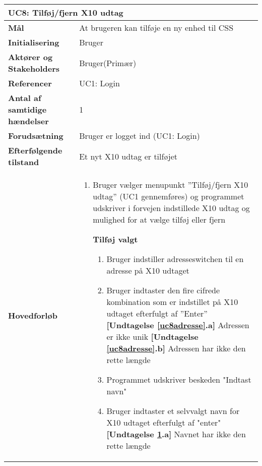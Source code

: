 \begin{table}[H] \centering
\begin{tabular}{|p{5cm}|p{9cm}|}
	\hline
		\multicolumn{2}{|l|}{\textbf{UC8: Tilføj/fjern X10 udtag}} \\\hline
		
		\textbf{Mål}							&At brugeren kan tilføje en ny enhed til CSS	\\\hline
		\textbf{Initialisering}				&Bruger					 					\\\hline
		\textbf{Aktører og Stakeholders}		&Bruger(Primær)								\\\hline
		\textbf{Referencer}					&UC1: Login									\\\hline
		\textbf{Antal af samtidige hændelser}&1 											\\\hline
		\textbf{Forudsætning}				&Bruger er logget ind (UC1: Login)			\\\hline
		\textbf{Efterfølgende tilstand}		&Et nyt X10 udtag er tilføjet 				\\\hline
		\textbf{Hovedforløb}					
			&\begin{enumerate}
				
				\item Bruger vælger menupunkt ''Tilføj/fjern X10 udtag'' (UC1 gennemføres) og programmet udskriver i forvejen indstillede X10 udtag og mulighed for at vælge tilføj eller fjern
					
				\subitem \textbf{Tilføj valgt}			
				\begin{enumerate}
					\item \label{uc8indstilAdresse} Bruger indstiller adresseswitchen til en adresse på X10 udtaget

					\item \label{uc8adresse} Bruger indtaster den fire cifrede kombination som er indstillet på X10 udtaget efterfulgt af ''Enter''\newline
						\textbf{[Undtagelse \ref{uc8adresse}.a]} Adressen er ikke unik\newline
						\textbf{[Undtagelse \ref{uc8adresse}.b]} Adressen har ikke den rette længde
				
					\item \label{uc8indstilNavn} Programmet udskriver beskeden "Indtast navn"
				
					\item \label{uc8navn} Bruger indtaster et selvvalgt navn for X10 udtaget efterfulgt af "enter"\newline
						\textbf{[Undtagelse \ref{uc8navn}.a]} Navnet har ikke den rette længde
				

\end{enumerate}
\end{enumerate}
\end{tabular}
\end{table}
